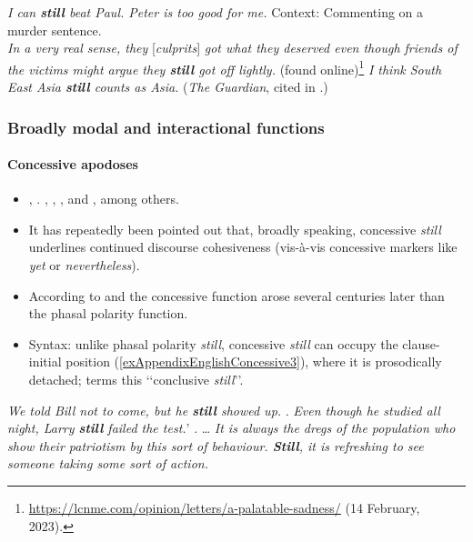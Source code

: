 \begin{exe}
	\ex \textit{I can \textbf{still} beat Paul. Peter is too good for me.} \parencite[185]{Koenig1977}
	\ex Context: Commenting on a murder sentence.\\
	\textit{In a very real sense, they} [\textit{culprits}] \textit{got what they deserved even though friends of the victims might argue they \textbf{still} got off lightly.} (found online)\footnote{\url{https://lcnme.com/opinion/letters/a-palatable-sadness/} (14 February, 2023).}
	\ex \textit{I think South East Asia \textbf{still} counts as Asia.} (\textit{The Guardian}, cited in \cite[129]{Lewis2019}.)
\end{exe}

\subsubsection{Broadly modal and interactional functions}
\paragraph{Concessive apodoses}
\label{appendixEnglishConcessiveConsequent}
\begin{itemize}
	\item \textcite{Bell2010}, \textcite{Ippolito2007}. \textcite{KoenigTraugott1982}, \textcite{Lewis2019},  \textcite{Michaelis1993}, \textcite[s.v. still]{OED2022} and \textcite{Ranger2018}, among others.
	\item  It has repeatedly been pointed out that, broadly speaking, concessive \textit{still} underlines continued discourse cohesiveness (vis-à-vis concessive markers like \textit{yet} or \textit{nevertheless}).
	\item According to \textcite{KoenigTraugott1982} and  \textcite[s.v. still]{OED2022} the concessive function arose several centuries later than the phasal polarity function.
	\item Syntax: unlike phasal polarity \textit{still}, concessive \textit{still} can occupy the clause-initial position (\ref{exAppendixEnglishConcessive3}), where it is prosodically detached; \textcite{Ranger2018} terms this \lq\lq conclusive \textit{still}\rq\rq.
\end{itemize}

\begin{exe}
	\ex \textit{We told Bill not to come, but he \textbf{still} showed up. }\parencite[193]{Michaelis1993}.
	\ex\textit{Even though he studied all night, Larry \textbf{still} failed the test.}\rq{ }\parencite[209]{Michaelis1993}.
	\ex
	\label{exAppendixEnglishConcessive3}
	… \textit{It is always the dregs of the population who show their patriotism by this sort of behaviour. \textbf{Still}, it is refreshing to see someone taking some sort of action. }\parencite[139]{Lewis2019}
\end{exe}
	
